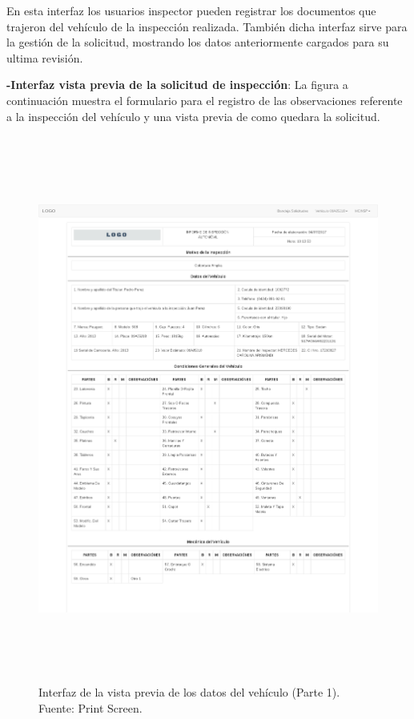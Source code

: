 En esta interfaz los usuarios inspector pueden registrar los documentos que trajeron del vehículo de la inspección realizada. También dicha interfaz sirve para la gestión de la solicitud, mostrando los datos anteriormente cargados para su ultima revisión.

\newpage
\textbf{-Interfaz vista previa de la solicitud de inspección}: La figura a continuación muestra el formulario para el registro de las observaciones referente a la inspección del vehículo y una vista previa de como quedara la solicitud.

\begin{figure}[H]
\begin{center}
	\includegraphics[width=\textwidth,height=18cm]{img/interfaces/prev_planilla_1.png}
\end{center}
\caption{Interfaz de la vista previa de los datos del vehículo (Parte 1). Fuente: Print Screen.}
\label{fig:interfaz_vista_previa_vehiculo_1}
\end{figure}

